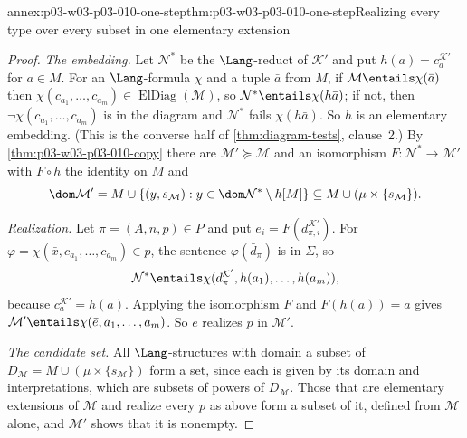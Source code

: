 \begin{annexitem}{annex:p03-w03-p03-010-one-step}{thm:p03-w03-p03-010-one-step}{Realizing every type over every subset in one elementary extension}
\begin{proof}
\emph{The embedding.}  Let \(\mathcal N^*\) be the \(\Lang\)-reduct of
\(\mathcal K'\) and put \(h(a)=c_a^{\mathcal K'}\) for \(a\in M\).  For an
\(\Lang\)-formula \(\chi\) and a tuple \(\bar a\) from \(M\), if
\(\mathcal M\entails\chi(\bar a)\) then
\(\chi(c_{a_1},\ldots,c_{a_m})\in\operatorname{ElDiag}(\mathcal M)\), so
\(\mathcal N^*\entails\chi(h\bar a)\); if not, then
\(\neg\chi(c_{a_1},\ldots,c_{a_m})\) is in the diagram and
\(\mathcal N^*\) fails \(\chi(h\bar a)\).  So \(h\) is an elementary
embedding.  (This is the converse half of \cref{thm:diagram-tests},
clause~2.)  By \cref{thm:p03-w03-p03-010-copy} there are
\(\mathcal M'\succcurlyeq\mathcal M\) and an isomorphism
\(F:\mathcal N^*\to\mathcal M'\) with \(F\circ h\) the identity on \(M\) and
\[
  \dom\mathcal M'=M\cup\{(y,s_{\mathcal M}):y\in\dom\mathcal
  N^*\setminus h[M]\}\subseteq M\cup(\mu\times\{s_{\mathcal M}\}).
\]

\emph{Realization.}  Let \(\pi=(A,n,p)\in P\) and put
\(e_i=F(d_{\pi,i}^{\mathcal K'})\).  For
\(\varphi=\chi(\bar x,c_{a_1},\ldots,c_{a_m})\in p\), the sentence
\(\varphi(\bar d_\pi)\) is in \(\Sigma\), so
\[
  \mathcal N^*\entails\chi(\bar d_\pi^{\mathcal K'},h(a_1),\ldots,h(a_m)),
\]
because \(c_a^{\mathcal K'}=h(a)\).  Applying the isomorphism \(F\) and
\(F(h(a))=a\) gives \(\mathcal M'\entails\chi(\bar e,a_1,\ldots,a_m)\).
So \(\bar e\) realizes \(p\) in \(\mathcal M'\).

\emph{The candidate set.}  All \(\Lang\)-structures with domain a subset of
\(D_{\mathcal M}=M\cup(\mu\times\{s_{\mathcal M}\})\) form a set, since
each is given by its domain and interpretations, which are subsets of
powers of \(D_{\mathcal M}\).  Those that are elementary extensions of
\(\mathcal M\) and realize every \(p\) as above form a subset of it, defined
from \(\mathcal M\) alone, and \(\mathcal M'\) shows that it is nonempty.
\end{proof}
\end{annexitem}

